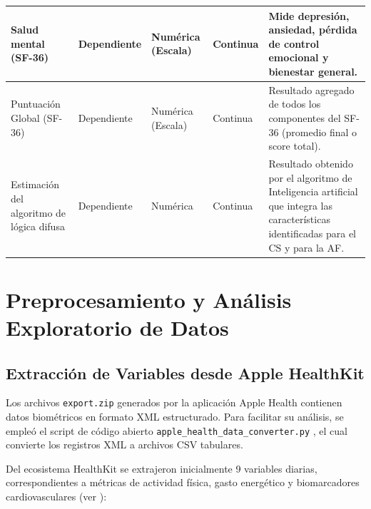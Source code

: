 \begin{table}[H]
\begin{longtable}{@{}p{3.5cm}p{2cm}p{2cm}p{2cm}p{4.5cm}@{}}
\midrule
Salud mental (SF-36) & Dependiente & Numérica (Escala) & Continua & Mide depresión, ansiedad, pérdida de control emocional y bienestar general. \\
\midrule
Puntuación Global (SF-36) & Dependiente & Numérica (Escala) & Continua & Resultado agregado de todos los componentes del SF-36 (promedio final o score total). \\
\midrule
Estimación del algoritmo de lógica difusa & Dependiente & Numérica & Continua & Resultado obtenido por el algoritmo de Inteligencia artificial que integra las características identificadas para el CS y para la AF. \\
\end{longtable}
\end{table}

\section{Preprocesamiento y Análisis Exploratorio de Datos}
\label{sec:preprocesamiento_eda}

\subsection{Extracción de Variables desde Apple HealthKit}
\label{subsec:extraccion_variables}

Los archivos \texttt{export.zip} generados por la aplicación Apple Health contienen datos biométricos en formato XML estructurado. Para facilitar su análisis, se empleó el script de código abierto \texttt{apple\_health\_data\_converter.py} \cite{Gaur2024AppleHealth}, el cual convierte los registros XML a archivos CSV tabulares.

Del ecosistema HealthKit se extrajeron inicialmente 9 variables diarias, correspondientes a métricas de actividad física, gasto energético y biomarcadores cardiovasculares (ver ):

